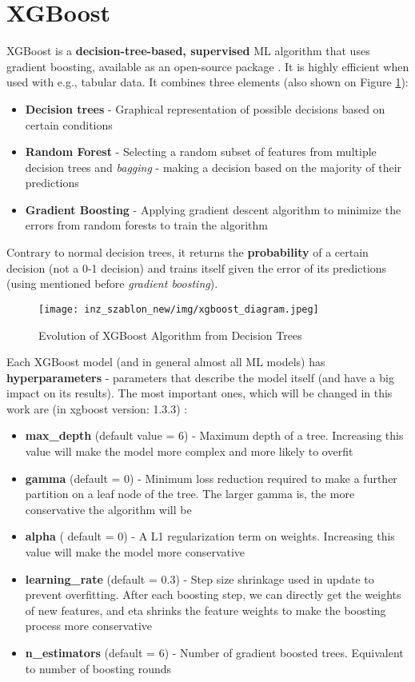 \section{XGBoost}
XGBoost  is a \textbf{decision-tree-based, supervised} ML algorithm that uses gradient boosting, available as an open-source package \cite{xgboost}. It is highly efficient when used with e.g., tabular data. \cite{shahid} It combines three elements (also shown on Figure \ref{xgboost diagram}): 
\begin{itemize}
    \item \textbf{Decision trees} - Graphical representation of possible decisions based on certain conditions
    \item \textbf{Random Forest} - Selecting a random subset of features from multiple decision trees and \emph{bagging} - making a decision based on the majority of their predictions
    \item \textbf{Gradient Boosting} - Applying gradient descent algorithm to minimize the errors from random forests to train the algorithm \cite{xgboost1}\\
\end{itemize}


Contrary to normal decision trees, it returns the \textbf{probability} of a certain decision (not a 0-1 decision) and trains itself given the error of its predictions (using mentioned before \emph{gradient boosting}).
\begin{figure}[H]
    \centering
    \texttt{[image: inz\_szablon\_new/img/xgboost\_diagram.jpeg]}
    \caption{Evolution of XGBoost Algorithm from Decision Trees \cite{xgboost1}}
    \label{xgboost diagram}
\end{figure}
Each XGBoost model (and in general almost all ML models) has \textbf{hyperparameters} - parameters that describe the model itself (and have a big impact on its results). The most important ones, which will be changed in this work are (in xgboost version: 1.3.3) \cite{xgboost-doc}:
\begin{itemize}
    \item \textbf{max\_depth} (default value = 6) - Maximum depth of a tree. Increasing this value will make the model more complex and more likely to overfit
    \item \textbf{gamma} (default = 0) - Minimum loss reduction required to make a further partition on a leaf node of the tree. The larger gamma is, the more conservative the algorithm will be
    \item \textbf{alpha} ( default = 0) - A L1 regularization term on weights. Increasing this value will make the model more conservative
    \item \textbf{learning\_rate} (default = 0.3) - Step size shrinkage used in update to prevent overfitting. After each boosting step, we can directly get the weights of new features, and eta shrinks the feature weights to make the boosting process more conservative
    \item \textbf{n\_estimators} (default = 6) - Number of gradient boosted trees. Equivalent to number of boosting rounds\\
\end{itemize}

